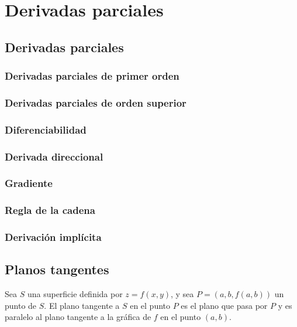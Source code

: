 \chapter{Derivadas parciales}

\newpage
\section{Derivadas parciales}

\subsection{Derivadas parciales de primer orden}

\subsection{Derivadas parciales de orden superior}

\subsection{Diferenciabilidad}

\subsection{Derivada direccional}

\subsection{Gradiente}

\subsection{Regla de la cadena}

\subsection{Derivación implícita}

\newpage
\section{Planos tangentes}

\begin{definicion}
    Sea $S$ una superficie definida por $z=f(x,y)$, y sea $P=(a,b,f(a,b))$ un punto de $S$. El plano tangente a $S$ en el punto $P$ es el plano que pasa por $P$ y es paralelo al plano tangente a la gráfica de $f$ en el punto $(a,b)$.
\end{definicion}

